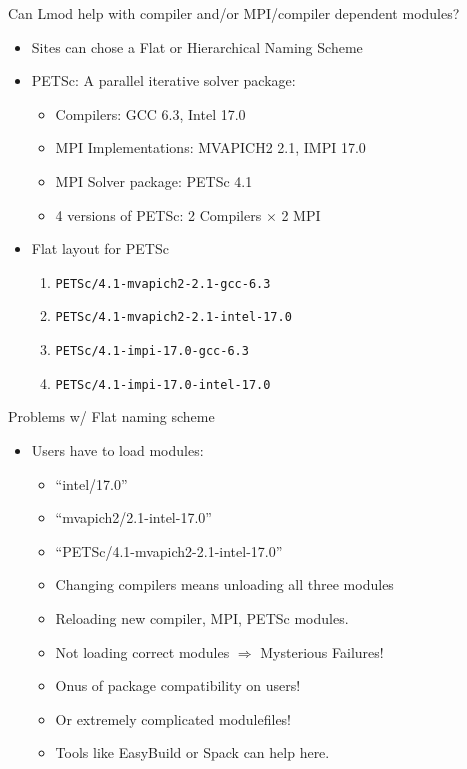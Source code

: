 \documentclass{beamer}
\begin{document}
\begin{frame}{Can Lmod help with compiler and/or MPI/compiler
      dependent modules?}
  \begin{itemize}
    \item Sites can chose a Flat or Hierarchical Naming Scheme
    \item PETSc: A parallel iterative solver package:
      \begin{itemize}
        \item Compilers: GCC 6.3, Intel 17.0
        \item MPI Implementations: MVAPICH2 2.1, IMPI 17.0
        \item MPI Solver package: PETSc 4.1
        \item 4 versions of PETSc: 2 Compilers $\times$ 2 MPI
      \end{itemize}

    \item Flat layout for PETSc
      \begin{enumerate}
        \item \texttt{PETSc/4.1-mvapich2-2.1-gcc-6.3}
        \item \texttt{PETSc/4.1-mvapich2-2.1-intel-17.0}
        \item \texttt{PETSc/4.1-impi-17.0-gcc-6.3}
        \item \texttt{PETSc/4.1-impi-17.0-intel-17.0}
      \end{enumerate}
  \end{itemize}
\end{frame}

\begin{frame}{Problems w/ Flat naming scheme}
  \begin{itemize}
    \item Users have to load modules:
      \begin{itemize}
        \item ``intel/17.0''
        \item ``mvapich2/2.1-intel-17.0''
        \item ``PETSc/4.1-mvapich2-2.1-intel-17.0''
        \item Changing compilers means unloading all three modules
        \item Reloading new compiler, MPI, PETSc modules.
        \item Not loading correct modules $\Rightarrow$ Mysterious Failures!
        \item Onus of package compatibility on users!
        \item Or extremely complicated modulefiles!
        \item Tools like EasyBuild or Spack can help here.
      \end{itemize}
  \end{itemize}
\end{frame}
\end{document}
